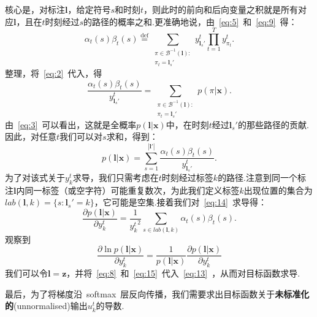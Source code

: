 \documentclass{ctexart}
\def\cB{\mathcal{B}}
\def\vl{\mathbf{l}}
\def\vx{\mathbf{x}}
\def\vz{\mathbf{z}}
\def\defeq{\overset{\mathrm{def}}{=}}
\begin{document}
核心是，对标注$\vl$，给定符号$s$和时刻$t$，则此时的前向和后向变量之积就是所有对应$\vl$，且在$t$时刻经过$s$的路径的概率之和.更准确地说，由~\eqref{eq:5}~和~\eqref{eq:9}~得：
\[
	\alpha_t(s)\beta_t(s)
	\defeq
	\sum_{
		\substack{
			\pi\in\cB^{-1}(\vl):\\
			\pi_t = \vl_s'
		}
	}
	y_{\vl_s'}^t
	\prod_{t=1}^T y_{\pi_t}^t.
\]
整理，将~\eqref{eq:2}~代入，得
\[\frac{\alpha_t(s)\beta_t(s)}{y_{\vl_s'}^t} = 
	\sum_{
		\substack{
			\pi\in\cB^{-1}(\vl):\\
			\pi_t = \vl_s'
		}
	}
	p(\pi|\vx).
\]
由~\eqref{eq:3}~可以看出，这就是全概率$p(\vl|\vx)$中，在时刻$t$经过$\vl_s'$的那些路径的贡献.因此，对任意$t$我们可以对$s$求和，得到：
\begin{equation}
	\label{eq:14}
	p(\vl|\vx) = \sum_{s=1}^{|\vl'|}\frac{\alpha_t(s)\beta_t(s)}{y_{\vl_s'}^t}.
\end{equation}
为了对该式关于$y_k^t$求导，我们只需考虑在$t$时刻经过标签$k$的路径.注意到同一个标注$\vl$内同一标签（或空字符）可能重复数次，为此我们定义标签$k$出现位置的集合为$\textit{lab}(\vl, k) = \{s : \vl_s' = k\}$，它可能是空集.接着我们对~\ref{eq:14}~求导得：
\begin{equation}
	\label{eq:15}
	\frac{\partial p(\vl|\vx)}{\partial y_k^t} = 
	\frac{1}{{y_k^t}^2}
	\sum_{s\in\textit{lab}(\vl, k)} \alpha_t(s)\beta_t(s).
\end{equation}
观察到
\[\frac{\partial\ln{p(\vl|\vx)}}{\partial y_k^t} = \frac{1}{p(\vl|\vx)}\frac{\partial p(\vl|\vx)}{\partial y_k^t}\]
我们可以令$\vl = \vz$，并将~\eqref{eq:8}~和~\eqref{eq:15}~代入~\eqref{eq:13}~，从而对目标函数求导.

最后，为了将梯度沿~softmax~层反向传播，我们需要求出目标函数关于\textbf{未标准化的}(unnormalised)输出$u_k^t$的导数.
\end{document}
